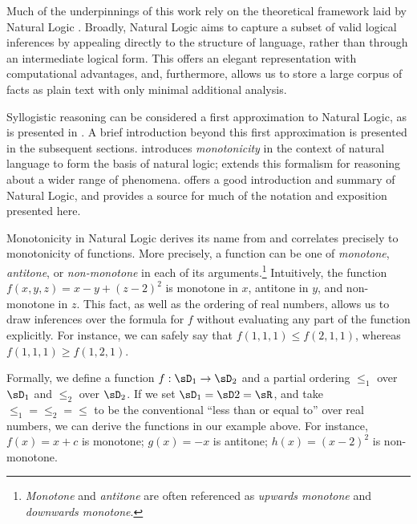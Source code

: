 Much of the underpinnings of this work rely on the theoretical framework
  laid by Natural Logic
  \cite{key:1986benthem-natlog,key:1991valencia-natlog}.
Broadly, Natural Logic aims to capture a subset of valid logical
  inferences by appealing directly to the structure of language,
  rather than through an intermediate logical form.
This offers an elegant representation with computational advantages,
  and, furthermore, allows us to store a large corpus of facts as
  plain text with only minimal additional analysis.

Syllogistic reasoning can be considered a first approximation to
  Natural Logic, as is presented in .
A brief introduction beyond this first approximation is presented
  in the subsequent sections.
 introduces \textit{monotonicity} in the context
  of natural language to form the basis of natural logic;
   extends this formalism for reasoning about
  a wider range of phenomena.
 offers a good introduction and summary of
  Natural Logic, and provides a source for much of the notation and
  exposition presented here.


Monotonicity in Natural Logic derives its name from and correlates
  precisely to monotonicity of functions.
More precisely, a function can be one of \textit{monotone},
  \textit{antitone}, or \textit{non-monotone} in each of its
  arguments.\footnote{
    \textit{Monotone} and \textit{antitone} are often referenced
    as \textit{upwards monotone} and \textit{downwards monotone}.
  }
Intuitively, the function $f(x,y,z) = x - y + (z-2)^2$ is
  monotone in $x$, antitone in $y$, and non-monotone in $z$.
This fact, as well as the ordering of real numbers, allows us to
  draw inferences over the formula for $f$ without evaluating
  any part of the function explicitly.
For instance, we can safely say that $f(1,1,1) \leq f(2,1,1)$, whereas
  $f(1,1,1) \geq f(1,2,1)$.

Formally, we define a function $f:\sD_1 \rightarrow \sD_2$ and a partial
  ordering $\le_1$ over $\sD_1$ and $\le_2$ over $\sD_2$.
If we set $\sD_1 = \sD2 = \sR$, and take $\le_1 = \le_2 = \le$ to be
  the conventional ``less than or equal to'' over real numbers,
  we can derive the functions in our example above.
For instance, $f(x) = x + c$ is monotone; $g(x) = -x$ is antitone;
  $h(x) = (x-2)^2$ is non-monotone.

